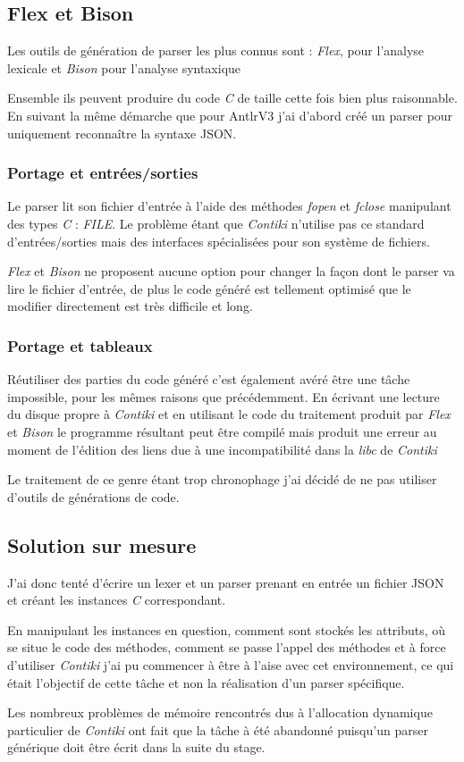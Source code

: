 \subsection{Flex et Bison}

Les outils de génération de parser les plus connus sont : \emph{Flex}\cite{flex}, pour l'analyse lexicale et \emph{Bison}\cite{bison} pour l'analyse syntaxique

Ensemble ils peuvent produire du code \emph{C} de taille cette fois bien plus raisonnable. En suivant la même démarche que pour AntlrV3 j'ai d'abord créé un parser pour uniquement reconnaître la syntaxe JSON.

\subsubsection{Portage et entrées/sorties}

Le parser lit son fichier d'entrée à l'aide des méthodes \emph{fopen} et \emph{fclose} manipulant des types \emph{C} : \emph{FILE}. Le problème étant que \emph{Contiki} n'utilise pas ce standard d'entrées/sorties mais des interfaces spécialisées pour son système de fichiers.

\emph{Flex} et \emph{Bison} ne proposent aucune option pour changer la façon dont le parser va lire le fichier d'entrée, de plus le code généré est tellement optimisé que le modifier directement est très difficile et long.

\subsubsection{Portage et tableaux}

Réutiliser des parties du code généré c'est également avéré être une tâche impossible, pour les mêmes raisons que précédemment. En écrivant une lecture du disque propre à \emph{Contiki} et en utilisant le code du traitement produit par \emph{Flex} et \emph{Bison} le programme résultant peut être compilé mais produit une erreur au moment de l'édition des liens due à une incompatibilité dans la \emph{libc} de \emph{Contiki}

Le traitement de ce genre étant trop chronophage j'ai décidé de ne pas utiliser d'outils de générations de code.

\subsection{Solution sur mesure}

J'ai donc tenté d'écrire un lexer et un parser prenant en entrée un fichier JSON et créant les instances \emph{C} correspondant.

En manipulant les instances en question, comment sont stockés les attributs, où se situe le code des méthodes, comment se passe l'appel des méthodes et à force d'utiliser \emph{Contiki} j'ai pu commencer à être à l'aise avec cet environnement, ce qui était l'objectif de cette tâche et non la réalisation d'un parser spécifique.

Les nombreux problèmes de mémoire rencontrés dus à l'allocation dynamique particulier de \emph{Contiki} ont fait que la tâche à été abandonné puisqu'un parser générique doit être écrit dans la suite du stage.